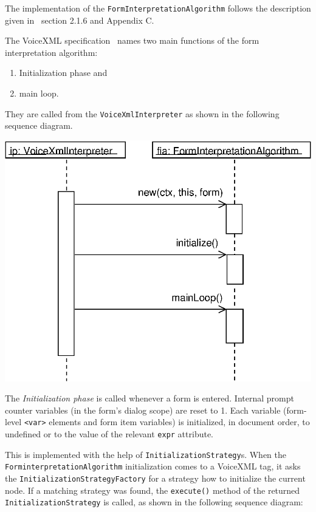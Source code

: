 \documentclass[11pt,a4paper]{article}
\begin{document}
The implementation of the \texttt{FormInterpretationAlgorithm} 
follows the description given in~\cite{w3.org:voicexml} section 2.1.6
and Appendix C.

The VoiceXML specification~\cite{w3.org:voicexml} names two main
functions of the form interpretation algorithm:
\begin{enumerate}
\item Initialization phase and
\item main loop.
\end{enumerate}

They are called from the \texttt{VoiceXmlInterpreter} as shown in the
following sequence diagram.

\begin{center}
\includegraphics[scale=0.7]{seq-interpreter-fia.eps}
\end{center}

The \emph{Initialization phase} is called whenever a form is entered.
Internal prompt counter variables (in the form's dialog scope) are reset to 1.
Each variable (form-level \texttt{<var>} elements and form item variables) is 
initialized, in document order, to undefined or to the value of the relevant 
\texttt{expr} attribute.

This is implemented with the help of \texttt{InitializationStrategy}s.
When the \texttt{ForminterpretationAlgorithm} initialization comes to a 
VoiceXML tag, it asks the \texttt{InitializationStrategyFactory} for a strategy
how to initialize the current node. If a matching strategy was found, the
\texttt{execute()} method of the returned \texttt{InitializationStrategy}
is called, as shown in the following sequence diagram:
\end{document}
